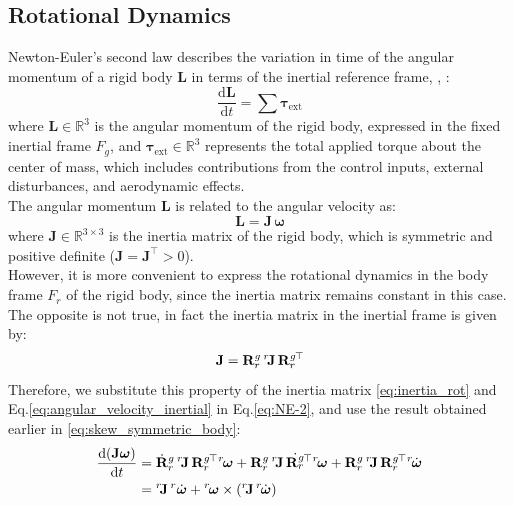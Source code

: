 \subsection{Rotational Dynamics}
Newton-Euler's second law describes the variation in time of the angular momentum of a rigid body $\mathbf{L}$ 
in terms of the inertial reference frame, \cite{quadrotor_modeling_control_book}, \cite{book-robotics}:
\begin{equation}
    \frac{\mathrm{d} \mathbf{L}}{\mathrm{d}t} = \sum \boldsymbol{\tau}_{\text{ext}}
    \label{eq:NE-2}
\end{equation}
where \( \mathbf{L} \in \mathbb{R}^3 \) is the angular momentum of the rigid body,
expressed in the fixed inertial frame \( F_g \), and \( \boldsymbol{\tau}_{\text{ext}} \in \mathbb{R}^3 \) 
represents the total applied torque about the center of mass, which includes contributions 
from the control inputs, external disturbances, and aerodynamic effects.
\noindent \\
The angular momentum \( \mathbf{L} \) is related to the angular velocity as:
\begin{equation}
    \mathbf{L} = \mathbf{J} \, \boldsymbol{\omega}
    \label{eq:angular_momentum}
\end{equation}
where \( \mathbf{J} \in \mathbb{R}^{3 \times 3} \) is the inertia matrix of the rigid body, 
which is symmetric and positive definite (\( \mathbf{J} = \mathbf{J}^\top > 0 \)).
\noindent \\
However, it is more convenient to express the rotational dynamics 
in the body frame \( F_r \) of the rigid body, since the inertia matrix remains constant in this case. 
The opposite is not true, in fact the inertia matrix in the inertial frame is given by:
\begin{equation}
    \mathbf{J} =  \mathbf{R}^g_r \, {}^r\mkern-3mu\mathbf{J} \,  {\mathbf{R}^g_r}\mkern-2mu^\top 
    \label{eq:inertia_rot}
\end{equation}
Therefore, we substitute this property of the inertia matrix \eqref{eq:inertia_rot} and 
Eq.\ref{eq:angular_velocity_inertial} in Eq.\ref{eq:NE-2}, 
and use the result obtained earlier in \ref{eq:skew_symmetric_body}:
\begin{align}
    \frac{\mathrm{d} (\mathbf{J} \boldsymbol{\omega})}{\mathrm{d}t} &= 
    \dot{\mathbf{R}}^g_r \, {}^r\mkern-3mu\mathbf{J} \, {\mathbf{R}^g_r}\mkern-2mu^\top  {}^r\mkern-2mu\boldsymbol{\omega} +
    \mathbf{R}^g_r \, {}^r\mkern-3mu\mathbf{J} \, \dot{\mathbf{R}^g_r}\mkern-2mu^\top  {}^r\mkern-2mu\boldsymbol{\omega} \notag 
     + \mathbf{R}^g_r \, {}^r\mkern-3mu\mathbf{J} \, {\mathbf{R}^g_r}\mkern-2mu^\top  {}^r\mkern-2mu\dot{\boldsymbol{\omega}} \notag \\
    &= {}^r\mkern-3mu\mathbf{J} \, {}^r\dot{\boldsymbol{\omega}} + 
    {}^r\mkern-2mu\boldsymbol{\omega} \times ({}^r\mkern-3mu\mathbf{J} \, {}^r\mkern-2mu\dot{\boldsymbol{\omega}})
    \label{eq:derivazione_rotational_law}
\end{align}
